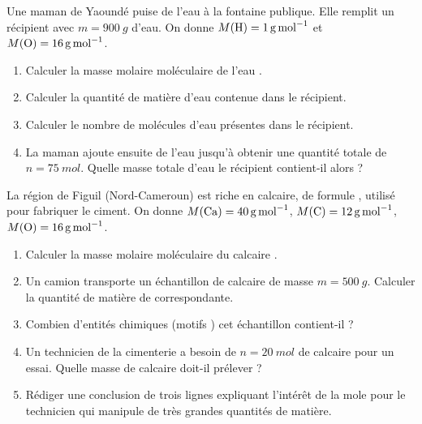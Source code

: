 \documentclass[11pt]{article}
\begin{document}
\begin{exercice}
Une maman de Yaoundé puise de l'eau  à la fontaine publique. Elle remplit un récipient avec $m = \SI{900}{g}$ d'eau. On donne $M(\ce{H}) = \SI{1}{g.mol^{-1}}$ et $M(\ce{O}) = \SI{16}{g.mol^{-1}}$.
\begin{enumerate}
\item Calculer la masse molaire moléculaire de l'eau .
\item Calculer la quantité de matière d'eau contenue dans le récipient.
\item Calculer le nombre de molécules d'eau présentes dans le récipient.
\item La maman ajoute ensuite de l'eau jusqu'à obtenir une quantité totale de $n = \SI{75}{mol}$. Quelle masse totale d'eau le récipient contient-il alors ?
\end{enumerate}
\end{exercice}

\begin{exercice}
La région de Figuil (Nord-Cameroun) est riche en calcaire, de formule , utilisé pour fabriquer le ciment. On donne $M(\ce{Ca}) = \SI{40}{g.mol^{-1}}$, $M(\ce{C}) = \SI{12}{g.mol^{-1}}$, $M(\ce{O}) = \SI{16}{g.mol^{-1}}$.
\begin{enumerate}
\item Calculer la masse molaire moléculaire du calcaire .
\item Un camion transporte un échantillon de calcaire de masse $m = \SI{500}{g}$. Calculer la quantité de matière de  correspondante.
\item Combien d'entités chimiques (motifs ) cet échantillon contient-il ?
\item Un technicien de la cimenterie a besoin de $n = \SI{20}{mol}$ de calcaire pour un essai. Quelle masse de calcaire doit-il prélever ?
\item Rédiger une conclusion de trois lignes expliquant l'intérêt de la mole pour le technicien qui manipule de très grandes quantités de matière.
\end{enumerate}
\end{exercice}
\end{document}
